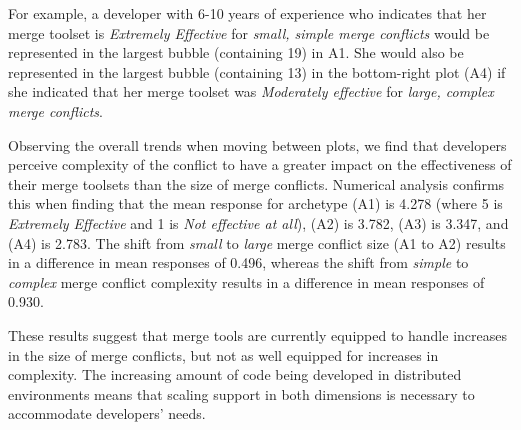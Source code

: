 For example, a developer with 6-10 years of experience who indicates that her merge toolset is \textit{Extremely Effective} for \textit{small, simple merge conflicts} would be represented in the largest bubble (containing 19) in A1. %
She would also be represented in the largest bubble (containing 13) in the bottom-right plot (A4) if she indicated that her merge toolset was \textit{Moderately effective} for \textit{large, complex merge conflicts}.

Observing the overall trends when moving between plots, we find that developers perceive complexity of the conflict to have a greater impact on the effectiveness of their merge toolsets than the size of merge conflicts.
Numerical analysis confirms this when finding that the mean response for archetype (A1) is 4.278 (where 5 is \textit{Extremely Effective} and 1 is \textit{Not effective at all}), (A2) is 3.782, (A3) is 3.347, and (A4) is 2.783.
The shift from \textit{small} to \textit{large} merge conflict size (A1 to A2) results in a difference in mean responses of 0.496, whereas the shift from \textit{simple} to \textit{complex} merge conflict complexity results in a difference in mean responses of 0.930.

These results suggest that merge tools are currently equipped to handle increases in the size of merge conflicts, but not as well equipped for increases in complexity.
The increasing amount of code being developed in distributed environments means that scaling support in both dimensions is necessary to accommodate developers' needs.